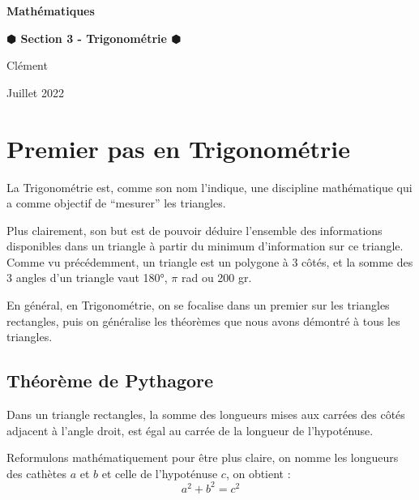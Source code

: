 \documentclass[a4paper]{article}
\begin{document}
	\begin{titlepage}
		\begin{center}
		
			\Huge	 \textbf{Mathématiques}\\
			\bigskip \smallskip
		
			\Large	 \textbf{$\varhexagonblack$ Section 3 - Trigonométrie $\varhexagonblack$}\\
			\bigskip
		
			\large	 Clément   \\ 
			\smallskip
		
			\normalfont	Juillet 2022\\
		
		\end{center}
		
		\doublespacing
		\tableofcontents
		\singlespacing

	\end{titlepage}





	\section{Premier pas en Trigonométrie}

		La Trigonométrie est, comme son nom l'indique, une discipline mathématique qui a comme objectif de “mesurer” les triangles.

		Plus clairement, son but est de pouvoir déduire l'ensemble des informations disponibles dans un triangle à partir du minimum d'information sur ce triangle.
		Comme vu précédemment, un triangle est un polygone à 3 côtés, et la somme des 3 angles d'un triangle vaut 180°, $\pi$ rad ou 200 gr.

		En général, en Trigonométrie, on se focalise dans un premier sur les triangles rectangles, puis on généralise les théorèmes que nous avons démontré à tous les triangles.

		\subsection{Théorème de Pythagore}

			Dans un triangle rectangles, la somme des longueurs mises aux carrées des côtés adjacent à l'angle droit, est égal au carrée de la longueur de l'hypoténuse.

			Reformulons mathématiquement pour être plus claire, on nomme les longueurs des cathètes $a$ et $b$ et celle de l'hypoténuse $c$, on obtient : $$a^2 + b^2 = c^2 $$
\end{document}
